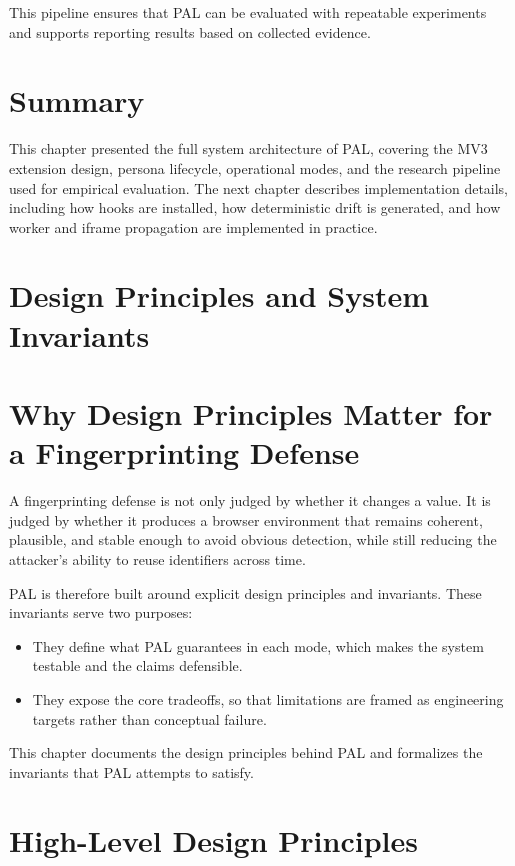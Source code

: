 \documentclass[11pt]{report}
\begin{document}
This pipeline ensures that PAL can be evaluated with repeatable experiments and supports reporting results based on collected evidence.

\section{Summary}

This chapter presented the full system architecture of PAL, covering the MV3 extension design, persona lifecycle, operational modes, and the research pipeline used for empirical evaluation. The next chapter describes implementation details, including how hooks are installed, how deterministic drift is generated, and how worker and iframe propagation are implemented in practice.

\section{Design Principles and System Invariants}

\section{Why Design Principles Matter for a Fingerprinting Defense}

A fingerprinting defense is not only judged by whether it changes a value. It is judged by whether it produces a browser environment that remains coherent, plausible, and stable enough to avoid obvious detection, while still reducing the attacker’s ability to reuse identifiers across time.

PAL is therefore built around explicit design principles and invariants. These invariants serve two purposes:

\begin{itemize}
    \item They define what PAL guarantees in each mode, which makes the system testable and the claims defensible.
    \item They expose the core tradeoffs, so that limitations are framed as engineering targets rather than conceptual failure.
\end{itemize}

This chapter documents the design principles behind PAL and formalizes the invariants that PAL attempts to satisfy.

\section{High-Level Design Principles}
\end{document}
